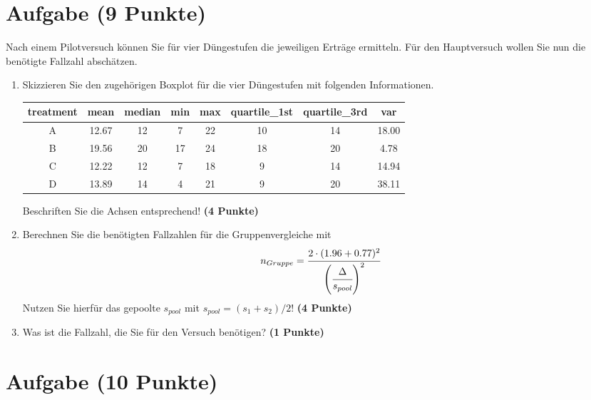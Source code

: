 \documentclass[a4paper, 10pt]{scrartcl}\usepackage[]{graphicx}\usepackage[]{xcolor}
\newenvironment{knitrout}{}{} %
\begin{document}
\clearpage

\section{Aufgabe \hfill (9 Punkte)}

Nach einem Pilotversuch k{\"o}nnen Sie f{\"u}r vier D{\"u}ngestufen die jeweiligen
Ertr{\"a}ge ermitteln. F{\"u}r den Hauptversuch wollen Sie nun die ben{\"o}tigte
Fallzahl absch{\"a}tzen. 



\begin{enumerate}
\item Skizzieren Sie den zugeh{\"o}rigen Boxplot f{\"u}r die vier D{\"u}ngestufen mit
  folgenden Informationen.
\begin{knitrout}
\color{fgcolor}\begin{table}[!h]
\centering
\begin{tabular}{cccccccc}
\toprule
treatment & mean & median & min & max & quartile\_1st & quartile\_3rd & var\\
\midrule
A & 12.67 & 12 & 7 & 22 & 10 & 14 & 18.00\\
B & 19.56 & 20 & 17 & 24 & 18 & 20 & 4.78\\
C & 12.22 & 12 & 7 & 18 & 9 & 14 & 14.94\\
D & 13.89 & 14 & 4 & 21 & 9 & 20 & 38.11\\
\bottomrule
\end{tabular}
\end{table}

\end{knitrout}
Beschriften Sie die Achsen entsprechend! \textbf{(4 Punkte)}
\item Berechnen Sie die ben{\"o}tigten Fallzahlen f{\"u}r die Gruppenvergleiche mit
\begin{equation*}
  n_{Gruppe} = \cfrac{2 \cdot (1.96 + 0.77)^2}{\left(\cfrac{\Delta}{s_{pool}}\right)^2}
\end{equation*}
Nutzen Sie hierf{\"u}r das gepoolte $s_{pool}$ mit $s_{pool} = (s_1 + s_2)/2$! \textbf{(4 Punkte)}
\item Was ist die Fallzahl, die Sie f{\"u}r den Versuch ben{\"o}tigen? \textbf{(1 Punkte)}
\end{enumerate} 
\clearpage

\section{Aufgabe \hfill (10 Punkte)}
\end{document}
